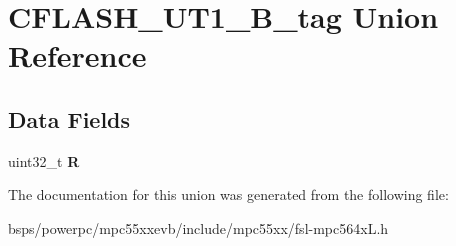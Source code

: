 \hypertarget{unionCFLASH__UT1__32B__tag}{}\section{C\+F\+L\+A\+S\+H\+\_\+\+U\+T1\+\_\+B\+\_\+tag Union Reference}
\label{unionCFLASH__UT1__32B__tag}
\subsection*{Data Fields}
\begin{DoxyCompactItemize}
\item 
\mbox{\label{unionCFLASH__UT1__32B__tag_a1de02028d941a47eb0caf0df41ca54d7}} 
uint32\+\_\+t {\bfseries R}
\end{DoxyCompactItemize}


The documentation for this union was generated from the following file\+:\begin{DoxyCompactItemize}
\item 
bsps/powerpc/mpc55xxevb/include/mpc55xx/fsl-\/mpc564x\+L.\+h\end{DoxyCompactItemize}
